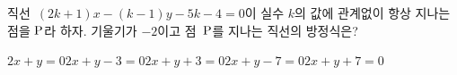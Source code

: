 직선~$(2k+1)x-(k-1)y-5k-4=0$이 실수 $k$의 값에 관계없이 항상 지나는 점을 $\mathrm{P}$라 하자. 기울기가 $-2$이고 점~$\mathrm{P}$를 지나는 직선의 방정식은?
\begin{choicesii}{$2x+y=0$}{$2x+y-3=0$}{$2x+y+3=0$}{$2x+y-7=0$}{$2x+y+7=0$}\end{choicesii}
